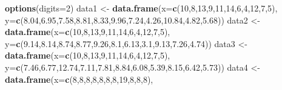 \documentclass[
]{article}
\newenvironment{Shaded}{\begin{snugshade}}{\end{snugshade}}
\newcommand{\DataTypeTok}[1]{\textcolor[rgb]{0.13,0.29,0.53}{#1}}
\newcommand{\DecValTok}[1]{\textcolor[rgb]{0.00,0.00,0.81}{#1}}
\newcommand{\FloatTok}[1]{\textcolor[rgb]{0.00,0.00,0.81}{#1}}
\newcommand{\KeywordTok}[1]{\textcolor[rgb]{0.13,0.29,0.53}{\textbf{#1}}}
\newcommand{\NormalTok}[1]{#1}
\newcommand{\StringTok}[1]{\textcolor[rgb]{0.31,0.60,0.02}{#1}}
\begin{document}
\begin{Shaded}
\begin{Highlighting}[]
\KeywordTok{options}\NormalTok{(}\DataTypeTok{digits=}\DecValTok{2}\NormalTok{)}
\NormalTok{data1 <-}\StringTok{ }\KeywordTok{data.frame}\NormalTok{(}\DataTypeTok{x=}\KeywordTok{c}\NormalTok{(}\DecValTok{10}\NormalTok{,}\DecValTok{8}\NormalTok{,}\DecValTok{13}\NormalTok{,}\DecValTok{9}\NormalTok{,}\DecValTok{11}\NormalTok{,}\DecValTok{14}\NormalTok{,}\DecValTok{6}\NormalTok{,}\DecValTok{4}\NormalTok{,}\DecValTok{12}\NormalTok{,}\DecValTok{7}\NormalTok{,}\DecValTok{5}\NormalTok{),}
                    \DataTypeTok{y=}\KeywordTok{c}\NormalTok{(}\FloatTok{8.04}\NormalTok{,}\FloatTok{6.95}\NormalTok{,}\FloatTok{7.58}\NormalTok{,}\FloatTok{8.81}\NormalTok{,}\FloatTok{8.33}\NormalTok{,}\FloatTok{9.96}\NormalTok{,}\FloatTok{7.24}\NormalTok{,}\FloatTok{4.26}\NormalTok{,}\FloatTok{10.84}\NormalTok{,}\FloatTok{4.82}\NormalTok{,}\FloatTok{5.68}\NormalTok{))}
\NormalTok{data2 <-}\StringTok{ }\KeywordTok{data.frame}\NormalTok{(}\DataTypeTok{x=}\KeywordTok{c}\NormalTok{(}\DecValTok{10}\NormalTok{,}\DecValTok{8}\NormalTok{,}\DecValTok{13}\NormalTok{,}\DecValTok{9}\NormalTok{,}\DecValTok{11}\NormalTok{,}\DecValTok{14}\NormalTok{,}\DecValTok{6}\NormalTok{,}\DecValTok{4}\NormalTok{,}\DecValTok{12}\NormalTok{,}\DecValTok{7}\NormalTok{,}\DecValTok{5}\NormalTok{),}
                    \DataTypeTok{y=}\KeywordTok{c}\NormalTok{(}\FloatTok{9.14}\NormalTok{,}\FloatTok{8.14}\NormalTok{,}\FloatTok{8.74}\NormalTok{,}\FloatTok{8.77}\NormalTok{,}\FloatTok{9.26}\NormalTok{,}\FloatTok{8.1}\NormalTok{,}\FloatTok{6.13}\NormalTok{,}\FloatTok{3.1}\NormalTok{,}\FloatTok{9.13}\NormalTok{,}\FloatTok{7.26}\NormalTok{,}\FloatTok{4.74}\NormalTok{))}
\NormalTok{data3 <-}\StringTok{ }\KeywordTok{data.frame}\NormalTok{(}\DataTypeTok{x=}\KeywordTok{c}\NormalTok{(}\DecValTok{10}\NormalTok{,}\DecValTok{8}\NormalTok{,}\DecValTok{13}\NormalTok{,}\DecValTok{9}\NormalTok{,}\DecValTok{11}\NormalTok{,}\DecValTok{14}\NormalTok{,}\DecValTok{6}\NormalTok{,}\DecValTok{4}\NormalTok{,}\DecValTok{12}\NormalTok{,}\DecValTok{7}\NormalTok{,}\DecValTok{5}\NormalTok{),}
                    \DataTypeTok{y=}\KeywordTok{c}\NormalTok{(}\FloatTok{7.46}\NormalTok{,}\FloatTok{6.77}\NormalTok{,}\FloatTok{12.74}\NormalTok{,}\FloatTok{7.11}\NormalTok{,}\FloatTok{7.81}\NormalTok{,}\FloatTok{8.84}\NormalTok{,}\FloatTok{6.08}\NormalTok{,}\FloatTok{5.39}\NormalTok{,}\FloatTok{8.15}\NormalTok{,}\FloatTok{6.42}\NormalTok{,}\FloatTok{5.73}\NormalTok{))}
\NormalTok{data4 <-}\StringTok{ }\KeywordTok{data.frame}\NormalTok{(}\DataTypeTok{x=}\KeywordTok{c}\NormalTok{(}\DecValTok{8}\NormalTok{,}\DecValTok{8}\NormalTok{,}\DecValTok{8}\NormalTok{,}\DecValTok{8}\NormalTok{,}\DecValTok{8}\NormalTok{,}\DecValTok{8}\NormalTok{,}\DecValTok{8}\NormalTok{,}\DecValTok{19}\NormalTok{,}\DecValTok{8}\NormalTok{,}\DecValTok{8}\NormalTok{,}\DecValTok{8}\NormalTok{),}

\end{Highlighting}
\end{Shaded}
\end{document}
